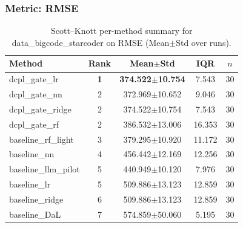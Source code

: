 \subsubsection*{Metric: RMSE}
\begin{table}[H]
\centering
\scriptsize
\setlength{\tabcolsep}{4pt}
\renewcommand{\arraystretch}{1.1}
\caption{Scott--Knott per-method summary for data\_bigcode\_starcoder on RMSE (Mean$\pm$Std over runs).}
\label{tab:sk_data_bigcode_starcoder_RMSE}
\begin{tabular}{l|c|c|c|c}
\hline
\textbf{Method} & \textbf{Rank} & \textbf{Mean$\pm$Std} & \textbf{IQR} & \textbf{$n$} \\
\hline
\rowcolor{red!15} dcpl\_gate\_lr & \textbf{1} & \textbf{374.522$\pm$10.754} & 7.543 & 30 \\
dcpl\_gate\_nn & 2 & 372.969$\pm$10.652 & 9.046 & 30 \\
dcpl\_gate\_ridge & 2 & 374.522$\pm$10.754 & 7.543 & 30 \\
dcpl\_gate\_rf & 2 & 386.532$\pm$13.006 & 16.353 & 30 \\
baseline\_rf\_light & 3 & 379.295$\pm$10.920 & 11.172 & 30 \\
baseline\_nn & 4 & 456.442$\pm$12.169 & 12.256 & 30 \\
baseline\_llm\_pilot & 5 & 440.949$\pm$10.120 & 7.976 & 30 \\
baseline\_lr & 5 & 509.886$\pm$13.123 & 12.859 & 30 \\
baseline\_ridge & 6 & 509.886$\pm$13.123 & 12.859 & 30 \\
baseline\_DaL & 7 & 574.859$\pm$50.060 & 5.195 & 30 \\
\hline
\end{tabular}
\end{table}

